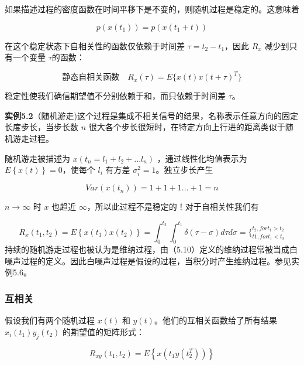 	     如果描述过程的密度函数在时间平移下是不变的，则随机过程是稳定的。这意味着
	     
	      \[ p(x(t_{1})) = p(x(t_{1}+t))  \]
	      
	      在这个稳定状态下自相关性的函数仅依赖于时间差  $ \tau=t_{2}-t_{1} $，因此 $ R_{x} $ 减少到只有一个变量 $ \tau $的函数：
	     
	      \begin{equation}\label{5.9}
	       静态自相关函数\quad R_{x}(\tau) = E\{x(t)x(t+\tau)^{T}\}
	     \end{equation}
	    
	   
	      稳定性使我们确信期望值不分别依赖于和，而只依赖于时间差 $ \tau $。
	      
	      \textbf{实例5.2}（随机游走)这个过程是集成不相关信号的结果，名称表示任意方向的固定长度步长，当步长数 $ n $ 很大各个步长很短时，在特定方向上行进的距离类似于随机游走过程。
	   
	  
	      随机游走被描述为  $ x(t_{n}=l_{1}+l_{2}+...l_{n}) $ ，通过线性化均值表示为 $ E\left\lbrace x(t)\right\rbrace = 0  $，使每个 $ l_{i} $ 有方差 $ \sigma_{i}^{2}=1 $。独立步长产生
	      
	      \[ Var(x(t_{n})) =1+1+1...+1=n\]
	      
	       $ n\rightarrow\infty $ 时 $ x $ 也趋近 $ \infty $，所以此过程不是稳定的！对于自相关性我们有
	       
	          \begin{equation}\label{5.10}
	         R_{x}(t_{1},t_{2}) = E\left\lbrace x(t_{1})x(t_{2})\right\rbrace =\int_{0}^{t_{2}}\int_0^{t_{1}} \delta(\tau-\sigma)d\tau d\sigma=\{_{t1,for t_{1} < t_{2}}^{t_{2},for t_{1} > t_{2}} 
	         \end{equation}
	      持续的随机游走过程也被认为是维纳过程，由（5.10）定义的维纳过程常被当成白噪声过程的定义。因此白噪声过程是假设的过程，当积分时产生维纳过程。参见实例5.6。
	          
	     \subsubsection { 互相关} 
	     
	     假设我们有两个随机过程 $ x(t) $ 和 $ y(t) $。他们的互相关函数给了所有结果 $ x_{i}(t_{1})y_{j}(t_{2}) $ 的期望值的矩阵形式：
	     
	    \begin{equation}\label{5.11}
	    R_{xy}(t_{1},t_{2}) = E\left\lbrace x(t_{1}y(t_{2}^{T})) \right\rbrace
	    \end{equation}
	     
